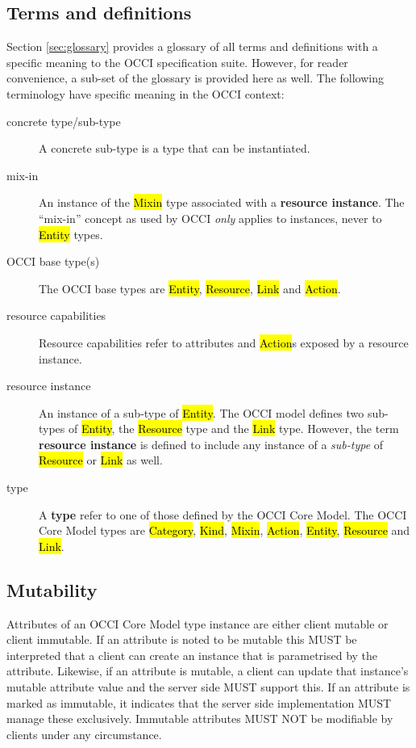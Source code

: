 \documentclass[10pt,a4paper]{article}
\begin{document}
\subsection{Terms and definitions}
Section \ref{sec:glossary} provides a glossary of all terms and definitions with
a specific meaning to the OCCI specification suite. However, for reader
convenience, a sub-set of the glossary is provided here as well. The following
terminology have specific meaning in the OCCI context:
\begin{description}
\item[concrete type/sub-type] A concrete sub-type is a type that can be instantiated.
\item[mix-in] An instance of the \hl{Mixin} type associated with a {\bf resource
 instance}. The ``mix-in'' concept as used by OCCI {\em only} applies to
 instances, never to \hl{Entity} types.
\item[OCCI base type(s)] The OCCI base types are \hl{Entity}, \hl{Resource},
 \hl{Link} and \hl{Action}.
\item[resource capabilities] Resource capabilities refer to attributes and
 \hl{Action}s exposed by a resource instance.
\item[resource instance] An instance of a sub-type of \hl{Entity}. The OCCI
 model defines two sub-types of \hl{Entity}, the \hl{Resource} type and the
 \hl{Link} type.  However, the term {\bf resource instance} is defined to
 include any instance of a {\em sub-type} of \hl{Resource} or \hl{Link} as
 well.
\item[type] A {\bf type} refer to one of those defined by the OCCI Core Model.
 The OCCI Core Model types are \hl{Category}, \hl{Kind}, \hl{Mixin},
 \hl{Action}, \hl{Entity}, \hl{Resource} and \hl{Link}.
\end{description}

\subsection{Mutability}

Attributes of an OCCI Core Model type instance are
either client mutable or client immutable. If an attribute is noted to
be mutable this MUST be interpreted that a client can create an
instance that is parametrised by the attribute. Likewise, if
an attribute is mutable, a client can update that instance's
mutable attribute value and the server side MUST support this. If an
attribute is marked as immutable, it indicates that the server side
implementation MUST manage these exclusively. Immutable attributes
MUST NOT be modifiable by clients under any circumstance.
\end{document}
